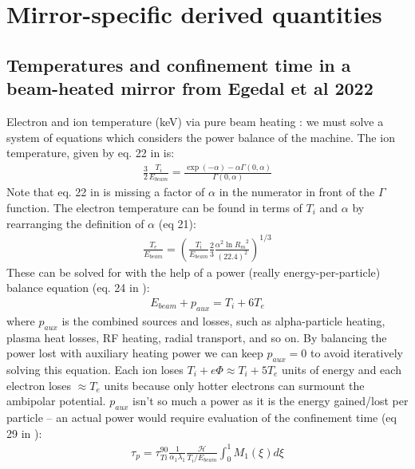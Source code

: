 \section{Mirror-specific derived quantities}

\subsection{Temperatures and confinement time in a beam-heated mirror from Egedal et al 2022 \cite{Egedal_2022}}

Electron and ion temperature (keV) via pure beam heating \cite{Egedal_2022}: we must solve a system of equations which considers the power balance of the machine. The ion temperature, given by eq. 22 in \cite{Egedal_2022} is:
\begin{align}
    \frac{3}{2} \frac{T_i}{E_{beam}} = \frac{\exp{(-\alpha)} - \alpha \Gamma(0, \alpha)}{\Gamma(0, \alpha)}
\end{align}
Note that eq. 22 in \cite{Egedal_2022} is missing a factor of $\alpha$ in the numerator in front of the $\Gamma$ function. The electron temperature can be found in terms of $T_i$ and $\alpha$ by rearranging the definition of $\alpha$ (eq 21):
\begin{align}
    \frac{T_e}{E_{beam}} =  \left( \frac{T_i}{E_{beam}} \frac{2}{3} \frac{\alpha^2 \ln{R_m}^2}{(22.4)^2} \right)^{1/3}
\end{align}
These can be solved for with the help of a power (really energy-per-particle) balance equation (eq. 24 in \cite{Egedal_2022}):
\begin{align}
    E_{beam} + p_{aux} = T_i + 6T_e
\end{align}
where $p_{aux}$ is the combined sources and losses, such as alpha-particle heating, plasma heat losses, RF heating, radial transport, and so on. By balancing the power lost with auxiliary heating power we can keep $p_{aux} = 0$ to avoid iteratively solving this equation. Each ion loses $T_i + e \Phi \approx T_i + 5 T_e$ units of energy and each electron loses $\approx T_e$ units because only hotter electrons can surmount the ambipolar potential. $p_{aux}$ isn't so much a power as it is the energy gained/lost per particle -- an actual power would require evaluation of the confinement time (eq 29 in \cite{Egedal_2022}):
\begin{align}
    \tau_p = \tau^{90}_{Ti} \frac{1}{\alpha_1 \lambda_1} \frac{\mathcal{H}}{T_i/E_{beam}}\int^1_0 M_1(\xi) d\xi
\end{align}
